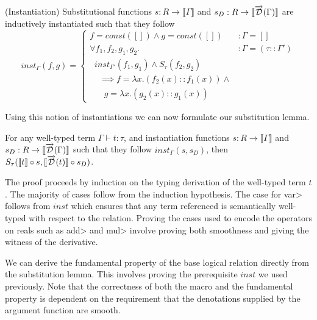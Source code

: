   \begin{definition}(Instantiation)
    Substitutional functions $s : R \rightarrow \llbracket \Gamma \rrbracket$ and $s_D : R \rightarrow \llbracket \overrightarrow{\mathcal{D}}(\Gamma) \rrbracket$ are inductively instantiated such that they follow
    \begin{equation}
      inst_\Gamma(f, g) =
        \left\{
          \begin{array}{ll}
            f = const([]) \wedge g = const([])
              & : \Gamma = [] \\
            \forall f_1, f_2, g_1, g_2.
              & : \Gamma = (\tau :: \Gamma') \\
              \;\;inst_{\Gamma'}(f_1, g_1) \wedge S_\tau(f_2, g_2) \\
              \;\;\;\; \implies f = \lambda x. (f_2(x) :: f_1(x)) \wedge \\
              \;\;\;\;\;\; g = \lambda x. (g_2(x) :: g_1(x))
          \end{array}
        \right.
    \label{eqn:inst_base}
    \end{equation}
  \end{definition}

  Using this notion of instantiations we can now formulate our substitution lemma.

  \begin{lemma}[Substitution]\label{thm:substitution_lemma}
    For any well-typed term $\Gamma \vdash t : \tau$, and instantiation functions $s : R \rightarrow \llbracket \Gamma \rrbracket$ and $s_D : R \rightarrow \llbracket \overrightarrow{\mathcal{D}}(\Gamma) \rrbracket$ such that they follow $inst_\Gamma(s, s_D)$, then $S_\tau(\llbracket t\rrbracket \circ s, \llbracket \overrightarrow{\mathcal{D}}(t)\rrbracket \circ s_D)$.
  \end{lemma}

  The proof proceeds by induction on the typing derivation of the well-typed term $t$.
  The majority of cases follow from the induction hypothesis.
  The case for \<var> follows from $inst$ which ensures that any term referenced is semantically well-typed with respect to the relation.
  Proving the cases used to encode the operators on reals such as \<add> and \<mul> involve proving both smoothness and giving the witness of the derivative.


  We can derive the fundamental property of the base logical relation directly from the substitution lemma.
  This involves proving the prerequisite $inst$ we used previously.
  Note that the correctness of both the macro and the fundamental property is dependent on the requirement that the denotations supplied by the argument function are smooth.

